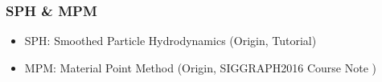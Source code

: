 \begin{frame}
    \frametitle{SPH \& MPM}
    \begin{itemize}
        \item SPH: Smoothed Particle Hydrodynamics (Origin\cite{priceSmoothedParticleHydrodynamics2012}, Tutorial\cite{koschierSmoothedParticleHydrodynamics2020})
        \item MPM: Material Point Method (Origin\cite{stomakhinMaterialPointMethod2013}, SIGGRAPH2016 Course Note \cite{jiangMaterialPointMethod2016})
    \end{itemize}
\end{frame}
